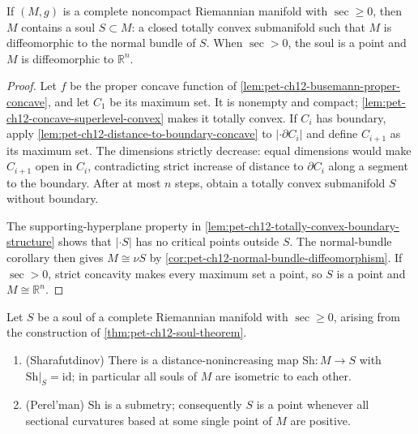 \begin{theorem}
  \label{thm:pet-ch12-soul-theorem}

  If $(M,g)$ is a complete noncompact Riemannian manifold with $\sec\ge0$, then
  $M$ contains a soul $S\subset M$: a closed totally convex submanifold such
  that $M$ is diffeomorphic to the normal bundle of $S$. When $\sec>0$, the soul
  is a point and $M$ is diffeomorphic to $\mathbb{R}^n$.
\end{theorem}
\begin{proof}
  \sketch
  Let \(f\) be the proper concave function of
  \cref{lem:pet-ch12-busemann-proper-concave}, and let \(C_1\) be its maximum
  set. It is nonempty and compact; \cref{lem:pet-ch12-concave-superlevel-convex}
  makes it totally convex. If \(C_i\) has boundary, apply
  \cref{lem:pet-ch12-distance-to-boundary-concave} to
  \( |\cdot\partial C_i|\) and define
  \(C_{i+1}\) as its maximum set. The dimensions strictly decrease: equal
  dimensions would make \(C_{i+1}\) open in \(C_i\), contradicting strict
  increase of distance to \(\partial C_i\) along a segment to the boundary.
  After at most \(n\) steps, obtain a totally convex submanifold \(S\) without
  boundary.

  The supporting-hyperplane property in
  \cref{lem:pet-ch12-totally-convex-boundary-structure} shows that
  \( |\cdot S|\) has
  no critical points outside \(S\). The normal-bundle corollary then gives
  \(M\cong\nu S\) by \cref{cor:pet-ch12-normal-bundle-diffeomorphism}. If
  \(\sec>0\), strict concavity makes every maximum set
  a point, so \(S\) is a point and \(M\cong\mathbb{R}^n\).
\end{proof}

\begin{theorem}
  \label{thm:pet-ch12-soul-uniqueness-submetry}

  Let $S$ be a soul of a complete Riemannian manifold with $\sec\ge0$, arising
  from the construction of \cref{thm:pet-ch12-soul-theorem}.
  \begin{enumerate}
    \item (Sharafutdinov) There is a distance-nonincreasing map
      $\mathrm{Sh}:M\to S$ with $\mathrm{Sh}|_S=\mathrm{id}$; in particular all
      souls of $M$ are isometric to each other.
    \item (Perel'man) $\mathrm{Sh}$ is a submetry; consequently $S$ is a point
      whenever all sectional curvatures based at some single point of $M$ are
      positive.
  \end{enumerate}
\end{theorem}

